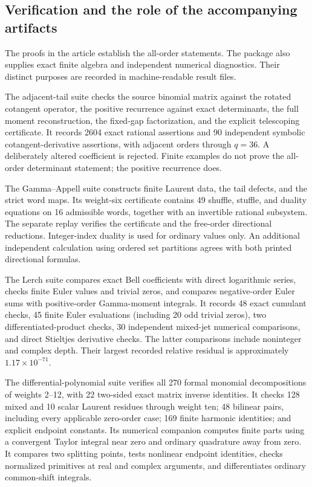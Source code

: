 \subsection{Verification and the role of the accompanying artifacts}
\label{audit:verification}

The proofs in the article establish the all-order statements. The
package also supplies exact finite algebra and independent numerical
diagnostics. Their distinct purposes are recorded in machine-readable
result files.

The adjacent-tail suite checks the source binomial matrix against the
rotated cotangent operator, the positive recurrence against exact
determinants, the full moment reconstruction, the fixed-gap
factorization, and the explicit telescoping certificate.
It records 2604 exact rational assertions and 90 independent symbolic
cotangent-derivative assertions, with adjacent orders through $q=36$.
A deliberately altered coefficient is rejected. Finite examples do not
prove the all-order determinant statement; the positive recurrence does.

The Gamma--Appell suite constructs finite Laurent data, the tail defects,
and the strict word maps. Its weight-six certificate contains 49
shuffle, stuffle, and duality equations on 16 admissible words, together
with an invertible rational subsystem. The separate replay verifies the
certificate and the free-order directional reductions. Integer-index
duality is used for ordinary values only. An additional independent
calculation using ordered set partitions agrees with both printed
directional formulas.

The Lerch suite compares exact Bell coefficients with direct logarithmic
series, checks finite Euler values and trivial zeros, and compares
negative-order Euler sums with positive-order Gamma-moment integrals.
It records 48 exact cumulant checks, 45 finite Euler evaluations
(including 20 odd trivial zeros), two differentiated-product checks,
30 independent mixed-jet numerical comparisons, and direct Stieltjes
derivative checks. The latter comparisons include noninteger and complex
depth. Their largest recorded relative residual is approximately
$1.17\times10^{-71}$.

The differential-polynomial suite verifies all 270 formal monomial
decompositions of weights 2--12, with 22 two-sided exact matrix inverse
identities. It checks 128 mixed and 10 scalar Laurent residues through
weight ten; 48 bilinear pairs, including every applicable zero-order
case; 169 finite harmonic identities; and explicit endpoint constants.
Its numerical companion computes finite parts using a convergent Taylor
integral near zero and ordinary quadrature away from zero. It compares
two splitting points, tests nonlinear endpoint identities, checks
normalized primitives at real and complex arguments, and differentiates
ordinary common-shift integrals.

